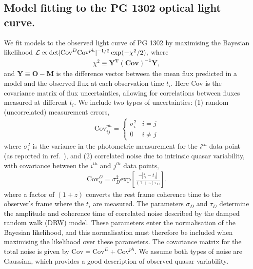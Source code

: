 \subsection{Model fitting to the PG 1302 optical light curve.}
%
We fit models to the observed light curve of PG 1302 by maximising the
Bayesian likelihood $\mathcal{L} \propto {\rm
  det}|{\mbox{Cov}^{D}}{\mbox{Cov}^{ph}}|^{-1/2}\exp(-\chi^2/2)$,
where
%
\begin{align}
\chi^2 \equiv \mathbf{Y^T} \mathbf{(\mbox{Cov})^{-1}}  \mathbf{Y},
\end{align}
%
and $\mathbf{Y} \equiv \mathbf{O} - \mathbf{M}$ is the difference
vector between the mean flux predicted in a model and the observed
flux at each observation time $t_i$. Here $\mbox{Cov}$ is the
covariance matrix of flux uncertainties, allowing for correlations
between fluxes measured at different $t_i$.  We include two types of
uncertainties: (1) random (uncorrelated) measurement errors,
%
\begin{align}
 \mbox{Cov}^{ph}_{ij} = 
 \begin{cases} 
      \sigma^2_i & i=j \\
      0 & i \neq j 
   \end{cases}
\end{align}
%
where $\sigma^2_i$ is the variance in the photometric measurement for the
$i^{th}$ data point (as reported in ref.~\cite{Graham+2015a}), and (2)
correlated noise due to intrinsic quasar variability, with covariance
between the $i^{th}$ and $j^{th}$ data points,
%
\begin{align}
\mbox{Cov}^{D}_{ij} = \sigma^2_{D} \mbox{exp}\left[ \frac{-|t_i - t_j|}{(1 + z) \tau_D}\right].
\end{align}
%
where a factor of $(1+z)$ converts the rest frame coherence time to
the observer's frame where the $t_i$ are measured.  The parameters
$\sigma_D$ and $\tau_D$ determine the amplitude and coherence time of
correlated noise described by the damped random walk (DRW)
model\cite{Kelly:2009:DRW}.  These parameters enter the normalisation
of the Bayesian likelihood, and this normalisation must therefore be
included when maximising the likelihood over these
parameters\cite{Kozlowski+2010}. The covariance matrix for the total
noise is given by $\mbox{Cov} = \mbox{Cov}^{D} + \mbox{Cov}^{ph}$. We
assume both types of noise are Gaussian, which provides a good
description of observed quasar variability\cite{Andrae+2013}.

